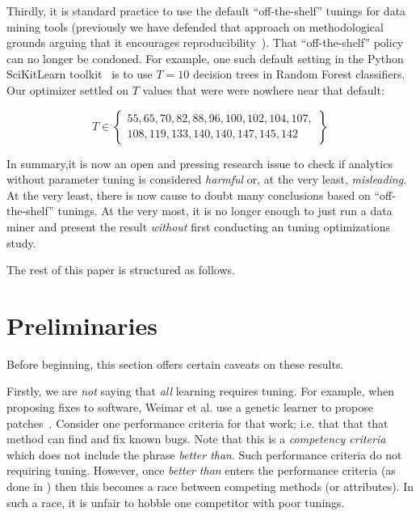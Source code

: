 \documentclass{sig-alternative}
\begin{document}
Thirdly, it is standard practice to use the default ``off-the-shelf'' tunings  for data mining tools (previously
we have defended that approach on methodological grounds arguing that it
encourages reproducibility~\cite{me15:book1}). That ``off-the-shelf''  policy
can no longer be condoned. For example, one such default setting
  in the Python SciKitLearn toolkit~\cite{scikit-learn}
is to use $T=10$ decision trees in  Random Forest classifiers.
Our optimizer settled on  $T$ values that were were nowhere near that default:

{\scriptsize
\[T \in \left\{\begin{array}{l} 55,  65, 70,   82, 88, 96, 100,  102,  104, 107,\\
                                108,  119, 133,  140, 140,   147,  145,  142   \end{array}\right\}
\]}


In summary,it is now an open and pressing research issue to check if
analytics without parameter tuning is considered {\em harmful} or, at the 
very least, {\em misleading}.
At the very least, there is now cause to doubt many conclusions based on
``off-the-shelf'' tunings.
At the very most, 
it is no longer enough to just run a data miner and present the result
{\em without} first conducting an tuning optimizations study.


The rest of this paper is structured as follows.

\section{Preliminaries}

Before beginning, this section offers certain caveats on these results.

Firstly, we are {\em not} saying that {\em all} learning requires
tuning. For example, when proposing fixes to software, Weimar et al. use a genetic learner
to propose patches~\cite{Weimer:2009}. Consider one performance criteria for that work; i.e. 
that   that that method can find and fix known bugs. Note that this is a {\em competency criteria}
which does not include the phrase  {\em better than}. Such performance criteria do
not requiring tuning.  However, once {\em better than} enters the performance criteria
(as done in \cite{lessmann2008benchmarking,hall11,me07b,bell2013limited,rahman2013how,me02k,moser2008comparative,zimmermann2007predicting,herzig2013predicting})
then this becomes a race between competing methods (or attributes).  In such a race, it is unfair
to hobble one competitor with poor tunings. 
 
\end{document}
